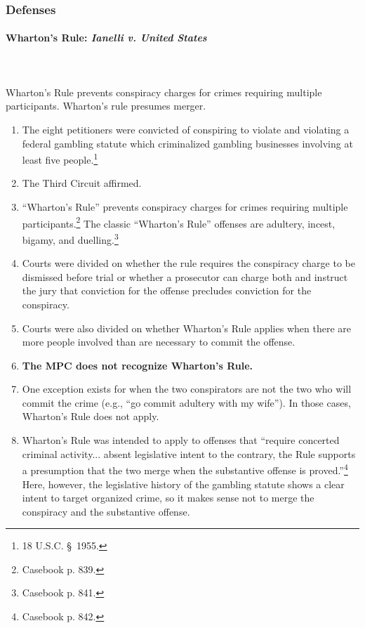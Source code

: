 \subsubsection{Defenses}

\paragraph{Wharton's Rule: \emph{Ianelli v. United States}}
~\\\\
Wharton's Rule prevents conspiracy charges for crimes requiring multiple 
participants. Wharton's rule presumes merger.

\begin{enumerate}
    \item The eight petitioners were convicted of conspiring to violate and 
    violating a federal gambling statute which criminalized gambling 
    businesses involving at least five people.\footnote{18 U.S.C. \S\ 1955.}
    \item The Third Circuit affirmed.
    \item ``Wharton's Rule'' prevents conspiracy charges for crimes requiring 
    multiple participants.\footnote{Casebook p. 839.} The classic ``Wharton's 
    Rule'' offenses are adultery, incest, bigamy, and 
    duelling.\footnote{Casebook p. 841.}
    \item Courts were divided on whether the rule requires the conspiracy 
    charge to be dismissed before trial or whether a prosecutor can charge 
    both and instruct the jury that conviction for the offense precludes 
    conviction for the conspiracy.
    \item Courts were also divided on whether Wharton's Rule applies when 
    there are more people involved than are necessary to commit the offense.
    \item \textbf{The MPC does not recognize Wharton's Rule.}
    \item One exception exists for when the two conspirators are not the two 
    who will commit the crime (e.g., ``go commit adultery with my wife''). In 
    those cases, Wharton's Rule does not apply.
    \item Wharton's Rule was intended to apply to offenses that ``require 
    concerted criminal activity... absent legislative intent to the contrary, 
    the Rule supports a presumption that the two merge when the substantive 
    offense is proved.''\footnote{Casebook p. 842.} Here, however, the 
    legislative history of the gambling statute shows a clear intent to target 
    organized crime, so it makes sense not to merge the conspiracy and the 
    substantive offense.
\end{enumerate}

